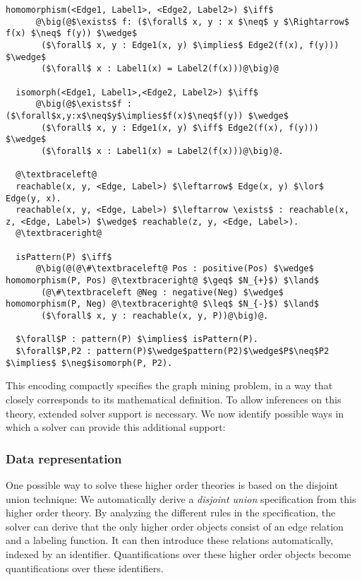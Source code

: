 \begin{lstlisting}[mathescape,style=model,caption={Faithfull encoding}]
  homomorphism(<Edge1, Label1>, <Edge2, Label2>) $\iff$
      @\big(@$\exists$ f: ($\forall$ x, y : x $\neq$ y $\Rightarrow$ f(x) $\neq$ f(y)) $\wedge$
       ($\forall$ x, y : Edge1(x, y) $\implies$ Edge2(f(x), f(y))) $\wedge$
       ($\forall$ x : Label1(x) = Label2(f(x)))@\big)@

  isomorph(<Edge1, Label1>,<Edge2, Label2>) $\iff$
      @\big(@$\exists$f : ($\forall$x,y:x$\neq$y$\implies$f(x)$\neq$f(y)) $\wedge$
       ($\forall$ x, y : Edge1(x, y) $\iff$ Edge2(f(x), f(y))) $\wedge$
       ($\forall$ x : Label1(x) = Label2(f(x)))@\big)@.

  @\textbraceleft@
  reachable(x, y, <Edge, Label>) $\leftarrow$ Edge(x, y) $\lor$ Edge(y, x).
  reachable(x, y, <Edge, Label>) $\leftarrow \exists$ : reachable(x, z, <Edge, Label>) $\wedge$ reachable(z, y, <Edge, Label>).
  @\textbraceright@
  
  isPattern(P) $\iff$
      @\big(@(@\#\textbraceleft@ Pos : positive(Pos) $\wedge$ homomorphism(P, Pos) @\textbraceright@ $\geq$ $N_{+}$) $\land$
       (@\#\textbraceleft @Neg : negative(Neg) $\wedge$ homomorphism(P, Neg) @\textbraceright@ $\leq$ $N_{-}$) $\land$
       ($\forall$ x, y : reachable(x, y, P))@\big)@.
      
  $\forall$P : pattern(P) $\implies$ isPattern(P). 
  $\forall$P,P2 : pattern(P)$\wedge$pattern(P2)$\wedge$P$\neq$P2 $\implies$ $\neg$isomorph(P, P2).

\end{lstlisting}


This encoding compactly specifies the graph mining problem, in a way that closely corresponds to its mathematical definition.
To allow inferences on this theory, extended solver support is necessary.
We now identify possible ways in which a solver can provide this additional support:

\subsubsection{Data representation}

One possible way to solve these higher order theories is based on the disjoint union technique: 
We automatically derive a \emph{disjoint union} specification from this higher order theory.
By analyzing the different rules in the specification, the solver can derive that the only  higher order objects consist of an edge relation and a labeling function.
It can then introduce these relations automatically, indexed by an identifier.
Quantifications over these higher order objects become quantifications over these identifiers.

